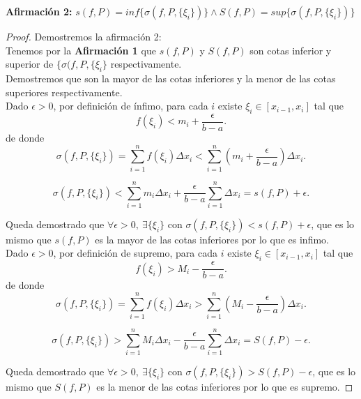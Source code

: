 \documentclass{article}
\begin{document}
\textbf{Afirmación 2:} \(s(f, P) = inf\{\sigma(f, P,\{\xi_i\})\} \wedge S(f, P) = sup\{\sigma(f, P,\{\xi_i\})\}\)
\begin{proof}
Demostremos la afirmación 2:\\

Tenemos por la \textbf{Afirmación 1} que \(s(f, P)\) y \(S(f,P)\) son cotas inferior y superior de \(\{\sigma(f, P,\{\xi_i\}\) respectivamente.\\

 Demostremos que son la mayor de las cotas inferiores y la menor de las cotas superiores respectivamente.\\

Dado \(\epsilon > 0\), por definición de ínfimo, para cada \(i\) existe \(\xi_i \in [x_{i-1}, x_i]\) tal que
\[
f(\xi_i) < m_i + \frac{\epsilon}{b - a}.
\]
de donde
\[
\sigma(f, P, \{\xi_i\}) = \sum_{i=1}^n f(\xi_i) \Delta x_i < \sum_{i=1}^n \left(m_i + \frac{\epsilon}{b - a}\right) \Delta x_i.
\]

\[
\sigma(f, P, \{\xi_i\}) < \sum_{i=1}^n m_i \Delta x_i+ \frac{\epsilon}{b - a} \sum_{i=1}^n \Delta x_i = s(f, P) + \epsilon.
\]

Queda demostrado que 
   \( \forall \epsilon > 0,\ \exists \{\xi_i\} \) con \( \sigma(f, P, \{\xi_i\}) < s(f, P) + \epsilon \), que es lo mismo que \(s(f, P)\) es la mayor de las cotas inferiores por lo que es infimo.\\

Dado \(\epsilon > 0\), por definición de supremo, para cada \(i\) existe \(\xi_i \in [x_{i-1}, x_i]\) tal que
\[
f(\xi_i) > M_i - \frac{\epsilon}{b - a}.
\]
de donde
\[
\sigma(f, P, \{\xi_i\}) = \sum_{i=1}^n f(\xi_i) \Delta x_i > \sum_{i=1}^n \left(M_i - \frac{\epsilon}{b - a}\right) \Delta x_i.
\]

\[
\sigma(f, P, \{\xi_i\}) > \sum_{i=1}^n M_i \Delta x_i - \frac{\epsilon}{b - a} \sum_{i=1}^n \Delta x_i = S(f, P) - \epsilon.
\]

Queda demostrado que 
   \( \forall \epsilon > 0,\ \exists \{\xi_i\} \) con \( \sigma(f, P, \{\xi_i\}) > S(f, P) - \epsilon \), que es lo mismo que \(S(f, P)\) es la menor de las cotas inferiores por lo que es supremo.




\end{proof}
\end{document}
